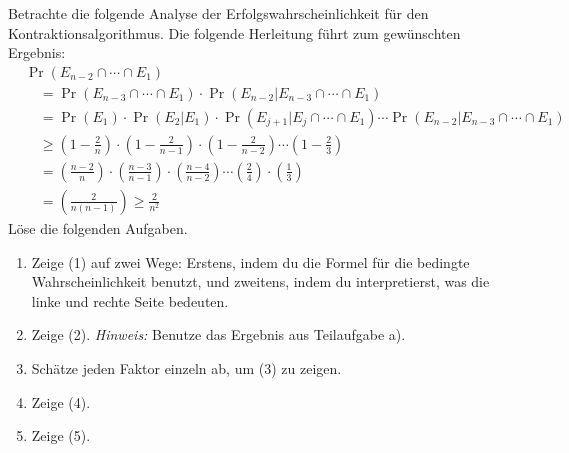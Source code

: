 \documentclass{uebung_cs}
\begin{document}
\begin{aufgabe}
	Betrachte die folgende Analyse der Erfolgswahrscheinlichkeit für den Kontraktionsalgorithmus. Die folgende Herleitung führt zum gewünschten Ergebnis:
	\begin{align}
	&\nonumber\Pr(E_{n-2} \cap \cdots \cap E_1) \\
	&\quad= \Pr(E_{n-3} \cap \cdots \cap E_1) \cdot \Pr(E_{n-2}|E_{n-3} \cap \cdots \cap E_1) \\
	&\quad= \Pr(E_1) \cdot \Pr(E_2|E_1) \cdot \Pr(E_{j+1} | E_j \cap \cdots \cap E_1) \cdots \Pr(E_{n-2} | E_{n-3} \cap \cdots \cap E_1) \\
	&\quad\ge \left(1 - \frac{2}{n} \right) \cdot \left(1 - \frac{2}{n-1} \right) \cdot \left(1 - \frac{2}{n-2} \right) \cdots \left(1 - \frac{2}{3} \right) \\
	&\quad= \left(\frac{n-2}{n}\right) \cdot \left(\frac{n-3}{n-1}\right) \cdot \left(\frac{n-4}{n-2}\right) \cdots \left(\frac{2}{4}\right) \cdot \left(\frac{1}{3}\right) \\
	&\quad= \left(\frac{2}{n(n-1)}\right) \geq \frac{2}{n^2}
	\end{align}
	Löse die folgenden Aufgaben.
	\begin{enumerate}
		\item Zeige (1) auf zwei Wege: Erstens, indem du die Formel für die bedingte Wahrscheinlichkeit benutzt, und zweitens, indem du interpretierst, was die linke und rechte Seite bedeuten.
		\item Zeige (2). \textit{Hinweis:} Benutze das Ergebnis aus Teilaufgabe a).
		\item Schätze jeden Faktor einzeln ab, um (3) zu zeigen. 
		\item Zeige (4).
		\item Zeige (5).
	\end{enumerate}
\end{aufgabe}
\end{document}
